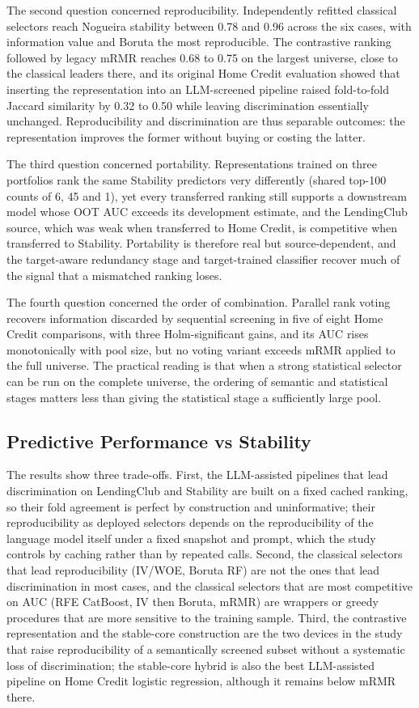\documentclass[preprint,12pt]{elsarticle}
\begin{document}
The second question concerned reproducibility. Independently refitted classical selectors reach Nogueira stability between 0.78 and 0.96 across the six cases, with information value and Boruta the most reproducible. The contrastive ranking followed by legacy mRMR reaches 0.68 to 0.75 on the largest universe, close to the classical leaders there, and its original Home Credit evaluation showed that inserting the representation into an LLM-screened pipeline raised fold-to-fold Jaccard similarity by 0.32 to 0.50 while leaving discrimination essentially unchanged. Reproducibility and discrimination are thus separable outcomes: the representation improves the former without buying or costing the latter.

The third question concerned portability. Representations trained on three portfolios rank the same Stability predictors very differently (shared top-100 counts of 6, 45 and 1), yet every transferred ranking still supports a downstream model whose OOT AUC exceeds its development estimate, and the LendingClub source, which was weak when transferred to Home Credit, is competitive when transferred to Stability. Portability is therefore real but source-dependent, and the target-aware redundancy stage and target-trained classifier recover much of the signal that a mismatched ranking loses.

The fourth question concerned the order of combination. Parallel rank voting recovers information discarded by sequential screening in five of eight Home Credit comparisons, with three Holm-significant gains, and its AUC rises monotonically with pool size, but no voting variant exceeds mRMR applied to the full universe. The practical reading is that when a strong statistical selector can be run on the complete universe, the ordering of semantic and statistical stages matters less than giving the statistical stage a sufficiently large pool.

\subsection{Predictive Performance vs Stability}
\label{subsec:performance_vs_stability}

The results show three trade-offs. First, the LLM-assisted pipelines that lead discrimination on LendingClub and Stability are built on a fixed cached ranking, so their fold agreement is perfect by construction and uninformative; their reproducibility as deployed selectors depends on the reproducibility of the language model itself under a fixed snapshot and prompt, which the study controls by caching rather than by repeated calls. Second, the classical selectors that lead reproducibility (IV/WOE, Boruta RF) are not the ones that lead discrimination in most cases, and the classical selectors that are most competitive on AUC (RFE CatBoost, IV then Boruta, mRMR) are wrappers or greedy procedures that are more sensitive to the training sample. Third, the contrastive representation and the stable-core construction are the two devices in the study that raise reproducibility of a semantically screened subset without a systematic loss of discrimination; the stable-core hybrid is also the best LLM-assisted pipeline on Home Credit logistic regression, although it remains below mRMR there.
\end{document}
